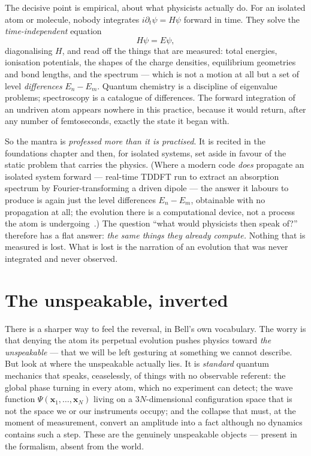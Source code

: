 \documentclass[11pt]{article}
\begin{document}
The decisive point is empirical, about what physicists actually do. For an isolated atom or molecule, nobody
integrates $i\partial_t\psi=H\psi$ forward in time. They solve the \emph{time-independent} equation
\[
H\psi=E\psi ,
\]
diagonalising $H$, and read off the things that are measured: total energies, ionisation potentials, the shapes
of the charge densities, equilibrium geometries and bond lengths, and the spectrum --- which is not a motion at
all but a set of level \emph{differences} $E_n-E_m$. Quantum chemistry is a discipline of eigenvalue problems;
spectroscopy is a catalogue of differences. The forward integration of an undriven atom appears nowhere in this
practice, because it would return, after any number of femtoseconds, exactly the state it began with.

So the mantra is \emph{professed more than it is practised}. It is recited in the foundations chapter and then,
for isolated systems, set aside in favour of the static problem that carries the physics. (Where a modern code
\emph{does} propagate an isolated system forward --- real-time TDDFT run to extract an absorption spectrum by
Fourier-transforming a driven dipole --- the answer it labours to produce is again just the level differences
$E_n-E_m$, obtainable with no propagation at all; the evolution there is a computational device, not a process
the atom is undergoing~\cite{Time}.) The question ``what would physicists then speak of?'' therefore has a flat
answer: \emph{the same things they already compute.} Nothing that is measured is lost. What is lost is the
narration of an evolution that was never integrated and never observed.

\section{The unspeakable, inverted}

There is a sharper way to feel the reversal, in Bell's own vocabulary. The worry is that denying the atom its
perpetual evolution pushes physics toward \emph{the unspeakable} --- that we will be left gesturing at
something we cannot describe. But look at where the unspeakable actually lies. It is \emph{standard} quantum
mechanics that speaks, ceaselessly, of things with no observable referent: the global phase turning in every
atom, which no experiment can detect; the wave function $\Psi(\mathbf x_1,\dots,\mathbf x_N)$ living on a
$3N$-dimensional configuration space that is not the space we or our instruments occupy; and the collapse that
must, at the moment of measurement, convert an amplitude into a fact although no dynamics contains such a step.
These are the genuinely unspeakable objects --- present in the formalism, absent from the world.
\end{document}
